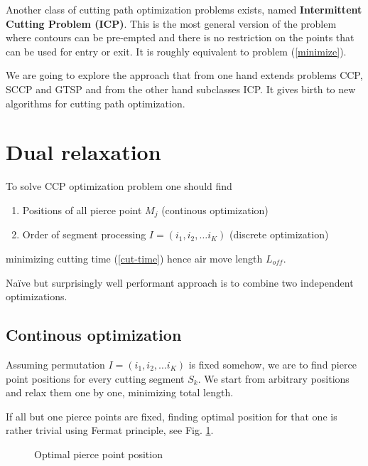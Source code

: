 \documentclass{../download/tPRS2e}
\begin{document}
Another class of cutting path optimization problems exists,
named \textbf{Intermittent Cutting Problem (ICP)}.
This is the most general version of the problem
where contours can be pre-empted and there is
no restriction on the points that can be used for entry or exit.
It is roughly equivalent to problem (\ref{minimize}).

We are going to explore the approach
that from one hand
extends problems CCP, SCCP and GTSP
and from the other hand
subclasses ICP.
It gives birth to new algorithms for
cutting path optimization.

\section{Dual relaxation}

To solve CCP optimization problem one should find
\begin{enumerate}
    \item{Positions of all pierce point $M_j$} (continous optimization)
    \item{Order of segment processing $I = (i_1, i_2, \dots i_K)$ } (discrete optimization)
\end{enumerate}
minimizing cutting time (\ref{cut-time})
hence air move length $L_{off}$.

Na\"ive but surprisingly well performant approach is to combine
two independent optimizations.

\subsection{Continous optimization}

Assuming permutation 
$I = (i_1, i_2, \dots i_K)$
is fixed somehow,
we are to find pierce point positions for every
cutting segment $S_k$.
We start from arbitrary positions
and relax them one by one,
minimizing total length.

If all but one pierce points are fixed,
finding optimal position for that one 
is rather trivial using Fermat principle,
see Fig. \ref{fermat}.

\begin{figure}[h]
    \begin{center}
    \caption{Optimal pierce point position} \label{fermat}
    \end{center}    
\end{figure}
    
\end{document}
